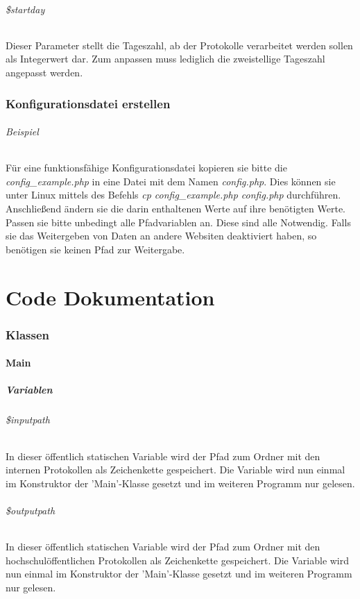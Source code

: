 \documentclass[12pt,parskip=full, pagea4]{scrartcl}
\begin{document}
	\paragraph{\$startday} Dieser Parameter stellt die Tageszahl, ab der Protokolle verarbeitet werden sollen als Integerwert dar. Zum anpassen muss lediglich die zweistellige Tageszahl angepasst werden.
	
	\section{Konfigurationsdatei erstellen}
	\paragraph{Beispiel} Für eine funktionsfähige Konfigurationsdatei kopieren sie bitte die \textit{config\_example.php} in eine Datei mit dem Namen \textit{config.php}. Dies können sie unter Linux mittels des Befehls \textit{cp config\_example.php config.php} durchführen. Anschließend ändern sie die darin enthaltenen Werte auf ihre benötigten Werte. Passen sie bitte unbedingt alle Pfadvariablen an. Diese sind alle Notwendig. Falls sie das Weitergeben von Daten an andere Websiten deaktiviert haben, so benötigen sie keinen Pfad zur Weitergabe. 
	
	\part{Code Dokumentation}
	\section{Klassen}
	\subsection{Main}
	\subsubsection{Variablen}
	
	\paragraph{\$inputpath} In dieser öffentlich statischen Variable wird der Pfad zum Ordner mit den internen Protokollen als Zeichenkette gespeichert. Die Variable wird nun einmal im Konstruktor der 'Main'-Klasse gesetzt und im weiteren Programm nur gelesen.
	
	\paragraph{\$outputpath} In dieser öffentlich statischen Variable wird der Pfad zum Ordner mit den hochschulöffentlichen Protokollen als Zeichenkette gespeichert. Die Variable wird nun einmal im Konstruktor der 'Main'-Klasse gesetzt und im weiteren Programm nur gelesen.
	
\end{document}
